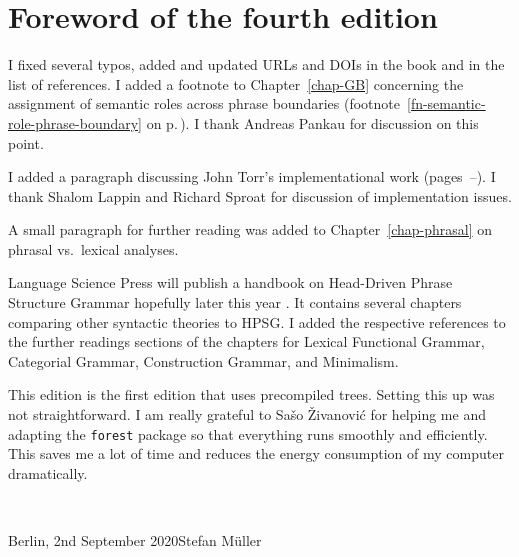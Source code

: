 
\section*{Foreword of the fourth edition}













I fixed several typos, added and updated URLs and DOIs in the book and in the list of references.
I added a footnote to Chapter~\ref{chap-GB} concerning the assignment of semantic roles
across phrase boundaries (footnote~\ref{fn-semantic-role-phrase-boundary} on
p.\,\pageref{fn-semantic-role-phrase-boundary}). I thank Andreas Pankau for discussion on this point.

I added a paragraph discussing John Torr's implementational work (pages~\pageref{page-torr-implementation-beginning}--\pageref{page-torr-implementation-end}). I thank Shalom Lappin and Richard Sproat for discussion of implementation issues.

A small paragraph for further reading was added to Chapter~\ref{chap-phrasal} on phrasal vs.\ lexical analyses.

Language Science Press will publish a handbook on Head-Driven Phrase Structure Grammar hopefully
later this year \citep*{HPSGHandbook}. It contains several chapters comparing other syntactic
theories to HPSG. I added the respective references to the further readings sections of the chapters
for Lexical Functional Grammar, Categorial Grammar, Construction Grammar, and Minimalism.

This edition is the first edition that uses precompiled trees. Setting this up was not
straightforward. I am really grateful to Sašo Živanović for helping me and adapting the
\texttt{forest} package so that everything runs smoothly and efficiently. This saves me a lot of
time and reduces the energy consumption of my computer dramatically.


~\medskip

\noindent
Berlin, 2nd September 2020\hfill Stefan Müller



